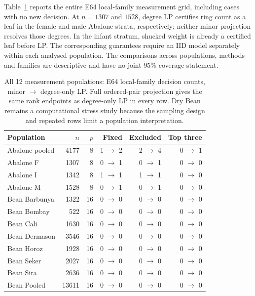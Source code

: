 Table~\ref{tab:decision-populations} reports the entire E64 local-family measurement grid, including cases with no new decision. At $n=1307$ and $1528$, degree LP certifies ring count as a leaf in the female and male Abalone strata, respectively; neither minor projection resolves those degrees. In the infant stratum, shucked weight is already a certified leaf before LP. The corresponding guarantees require an IID model separately within each analysed population. The comparisons across populations, methods and families are descriptive and have no joint 95\% coverage statement.


\begin{table}[H]\centering\small
\setlength{\tabcolsep}{4pt}
\caption{All 12 measurement populations: E64 local-family decision counts, minor $\to$ degree-only LP. Full ordered-pair projection gives the same rank endpoints as degree-only LP in every row. Dry Bean remains a computational stress study because the sampling design and repeated rows limit a population interpretation.}\label{tab:decision-populations}
\begin{lrbox}{\resultsbox}\begin{tabular}{lrrrrr}
\toprule
Population & $n$ & $p$ & Fixed & Excluded & Top three\\
\midrule
Abalone pooled & 4177 & 8 & 1 $\to$ 2 & 2 $\to$ 4 & 0 $\to$ 1\\
Abalone F & 1307 & 8 & 0 $\to$ 1 & 0 $\to$ 1 & 0 $\to$ 0\\
Abalone I & 1342 & 8 & 1 $\to$ 1 & 1 $\to$ 1 & 0 $\to$ 0\\
Abalone M & 1528 & 8 & 0 $\to$ 1 & 0 $\to$ 1 & 0 $\to$ 0\\
Bean Barbunya & 1322 & 16 & 0 $\to$ 0 & 0 $\to$ 0 & 0 $\to$ 0\\
Bean Bombay & 522 & 16 & 0 $\to$ 0 & 0 $\to$ 0 & 0 $\to$ 0\\
Bean Cali & 1630 & 16 & 0 $\to$ 0 & 0 $\to$ 0 & 0 $\to$ 0\\
Bean Dermason & 3546 & 16 & 0 $\to$ 0 & 0 $\to$ 0 & 0 $\to$ 0\\
Bean Horoz & 1928 & 16 & 0 $\to$ 0 & 0 $\to$ 0 & 0 $\to$ 0\\
Bean Seker & 2027 & 16 & 0 $\to$ 0 & 0 $\to$ 0 & 0 $\to$ 0\\
Bean Sira & 2636 & 16 & 0 $\to$ 0 & 0 $\to$ 0 & 0 $\to$ 0\\
Bean Pooled & 13611 & 16 & 0 $\to$ 0 & 0 $\to$ 0 & 0 $\to$ 0\\
\bottomrule\end{tabular}\end{lrbox}\ifdim\wd\resultsbox>\linewidth\resizebox{\linewidth}{!}{\usebox{\resultsbox}}\else\usebox{\resultsbox}\fi\end{table}



